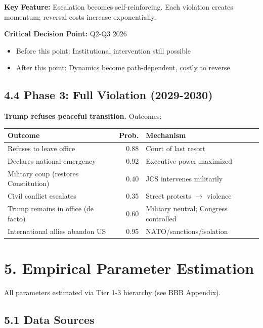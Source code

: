 \textbf{Key Feature:} Escalation becomes self-reinforcing. Each violation creates momentum; reversal costs increase exponentially.

\textbf{Critical Decision Point:} Q2-Q3 2026
\begin{itemize}
\item Before this point: Institutional intervention still possible
\item After this point: Dynamics become path-dependent, costly to reverse
\end{itemize}

\subsection{4.4 Phase 3: Full Violation (2029-2030)}

\textbf{Trump refuses peaceful transition.} Outcomes:

\begin{table}[h]
\centering
\begin{tabular}{|l|r|l|}
\hline
\textbf{Outcome} & \textbf{Prob.} & \textbf{Mechanism} \\
\hline
Refuses to leave office & 0.88 & Court of last resort \\
Declares national emergency & 0.92 & Executive power maximized \\
Military coup (restores Constitution) & 0.40 & JCS intervenes militarily \\
Civil conflict escalates & 0.35 & Street protests $\to$ violence \\
Trump remains in office (de facto) & 0.60 & Military neutral; Congress controlled \\
International allies abandon US & 0.95 & NATO/sanctions/isolation \\
\hline
\end{tabular}
\end{table}

\section{5. Empirical Parameter Estimation}

All parameters estimated via Tier 1-3 hierarchy (see BBB Appendix).

\subsection{5.1 Data Sources}

